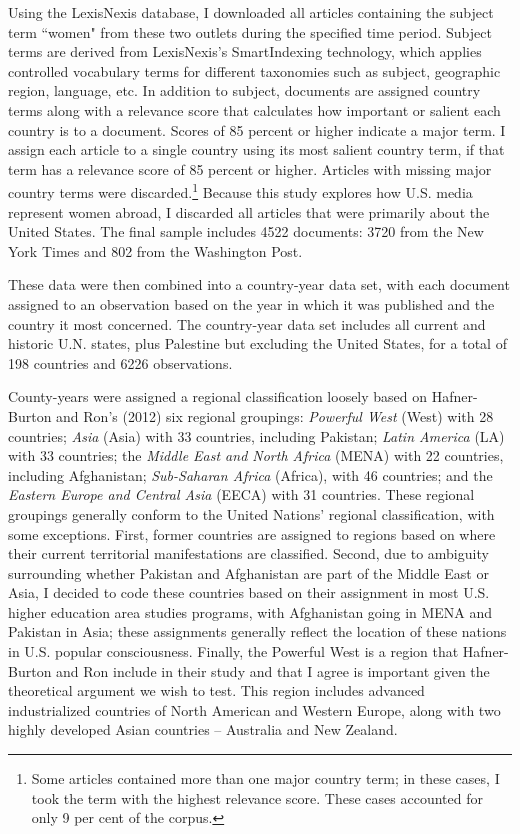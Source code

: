\documentclass[11pt, oneside]{article}
\begin{document}
Using the LexisNexis database, I downloaded all articles containing the subject term ``women" from these two outlets during the specified time period. Subject terms are derived from LexisNexis's SmartIndexing technology, which applies controlled vocabulary terms for different taxonomies such as subject, geographic region, language, etc. In addition to subject, documents are assigned country terms along with a relevance score that calculates how important or salient each country is to a document. Scores of 85 percent or higher indicate a major term. I assign each article to a single country using its most salient country term, if that term has a relevance score of 85 percent or higher. Articles with missing major country terms were discarded.\footnote{\hspace{5}Some articles contained more than one major country term; in these cases, I took the term with the highest relevance score. These cases accounted for only 9 per cent of the corpus.}  Because this study explores how U.S. media represent women abroad, I discarded all articles that were primarily about the United States. The final sample includes 4522 documents: 3720 from the New York Times and 802 from the Washington Post. 

These data were then combined into a country-year data set, with each document assigned to an observation based on the year in which it was published and the country it most concerned. The country-year data set includes all current and historic U.N. states, plus Palestine but excluding the United States, for a total of 198 countries and 6226 observations. 

County-years were assigned a regional classification loosely based on Hafner-Burton and Ron's (2012) six regional groupings: \emph{Powerful West} (West) with 28 countries; \emph{Asia} (Asia) with 33 countries, including Pakistan; \emph{Latin America} (LA) with 33 countries; the \emph{Middle East and North Africa} (MENA) with 22 countries, including Afghanistan; \emph{Sub-Saharan Africa} (Africa), with 46 countries; and the \emph{Eastern Europe and Central Asia} (EECA) with 31 countries. These regional groupings generally conform to the United Nations' regional classification, with some exceptions. First, former countries are assigned to regions based on where their current territorial manifestations are classified. Second, due to ambiguity surrounding whether Pakistan and Afghanistan are part of the Middle East or Asia, I decided to code these countries based on their assignment in most U.S. higher education area studies programs, with Afghanistan going in MENA and Pakistan in Asia; these assignments generally reflect the location of these nations in U.S. popular consciousness. Finally, the Powerful West is a region that Hafner-Burton and Ron include in their study and that I agree is important given the theoretical argument we wish to test. This region includes advanced industrialized countries of North American and Western Europe, along with two highly developed Asian countries -- Australia and New Zealand.
\end{document}
